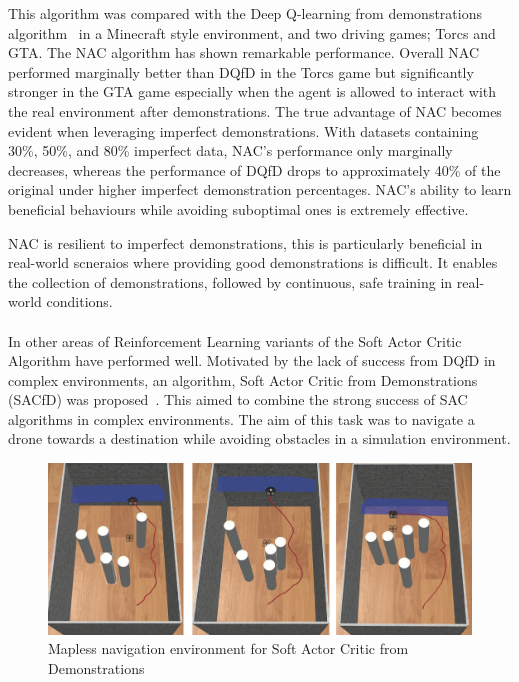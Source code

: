 This algorithm was compared with the Deep Q-learning from demonstrations algorithm~\cite{deepQLearningFromDemo} in a Minecraft style environment, and two driving games; Torcs and GTA.
The NAC algorithm has shown remarkable performance.
Overall NAC performed marginally better than DQfD in the Torcs game but significantly stronger in the GTA game especially when the agent is allowed to interact with the real environment after demonstrations.
The true advantage of NAC becomes evident when leveraging imperfect demonstrations.
With datasets containing 30\%, 50\%, and 80\% imperfect data, NAC's performance only marginally decreases, whereas the performance of DQfD drops to approximately 40\% of the original under higher imperfect demonstration percentages.
NAC's ability to learn beneficial behaviours while avoiding suboptimal ones is extremely effective.

NAC is resilient to imperfect demonstrations, this is particularly beneficial in real-world scneraios where providing good demonstrations is difficult.
It enables the collection of demonstrations, followed by continuous, safe training in real-world conditions. \\\\


In other areas of Reinforcement Learning variants of the Soft Actor Critic Algorithm have performed well.
Motivated by the lack of success from DQfD in complex environments, an algorithm, Soft Actor Critic from Demonstrations (SACfD) was proposed~\cite{SACfDMaplessNavigation}.
This aimed to combine the strong success of SAC algorithms in complex environments.
The aim of this task was to navigate a drone towards a destination while avoiding obstacles in a simulation environment.

\begin{figure}[htbp]
  \centering
  \includegraphics[width=\textwidth]{background/fyp17-sacfd.png}
  \caption{Mapless navigation environment for Soft Actor Critic from Demonstrations}
\label{fig:fyp17-sacfd}
\end{figure}

